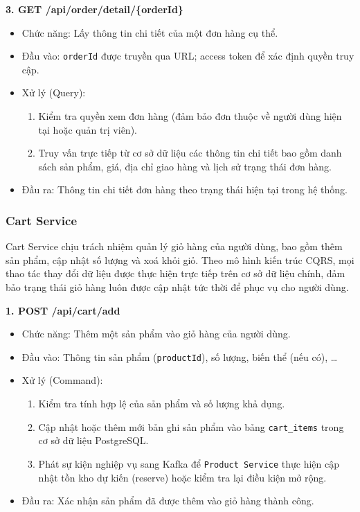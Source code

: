 \textbf{3. GET /api/order/detail/\{orderId\}}
\begin{itemize}
    \item Chức năng: Lấy thông tin chi tiết của một đơn hàng cụ thể.
    \item Đầu vào: \texttt{orderId} được truyền qua URL; access token để xác định quyền truy cập.
    \item Xử lý (Query):
    \begin{enumerate}
        \item Kiểm tra quyền xem đơn hàng (đảm bảo đơn thuộc về người dùng hiện tại hoặc quản trị viên).
        \item Truy vấn trực tiếp từ cơ sở dữ liệu các thông tin chi tiết bao gồm danh sách sản phẩm, giá, địa chỉ giao hàng và lịch sử trạng thái đơn hàng.
    \end{enumerate}
    \item Đầu ra: Thông tin chi tiết đơn hàng theo trạng thái hiện tại trong hệ thống.
\end{itemize}

\subsubsection{Cart Service}

Cart Service chịu trách nhiệm quản lý giỏ hàng của người dùng, bao gồm thêm sản phẩm, cập nhật số lượng và xoá khỏi giỏ. Theo mô hình kiến trúc CQRS, mọi thao tác thay đổi dữ liệu được thực hiện trực tiếp trên cơ sở dữ liệu chính, đảm bảo trạng thái giỏ hàng luôn được cập nhật tức thời để phục vụ cho người dùng.

\textbf{1. POST /api/cart/add}
\begin{itemize}
    \item Chức năng: Thêm một sản phẩm vào giỏ hàng của người dùng.
    \item Đầu vào: Thông tin sản phẩm (\texttt{productId}), số lượng, biến thể (nếu có), \dots
    \item Xử lý (Command):
    \begin{enumerate}
        \item Kiểm tra tính hợp lệ của sản phẩm và số lượng khả dụng.
        \item Cập nhật hoặc thêm mới bản ghi sản phẩm vào bảng \texttt{cart\_items} trong cơ sở dữ liệu PostgreSQL.
        \item Phát sự kiện nghiệp vụ sang Kafka để \texttt{Product Service} thực hiện cập nhật tồn kho dự kiến (reserve) hoặc kiểm tra lại điều kiện mở rộng.
    \end{enumerate}
    \item Đầu ra: Xác nhận sản phẩm đã được thêm vào giỏ hàng thành công.
\end{itemize}

